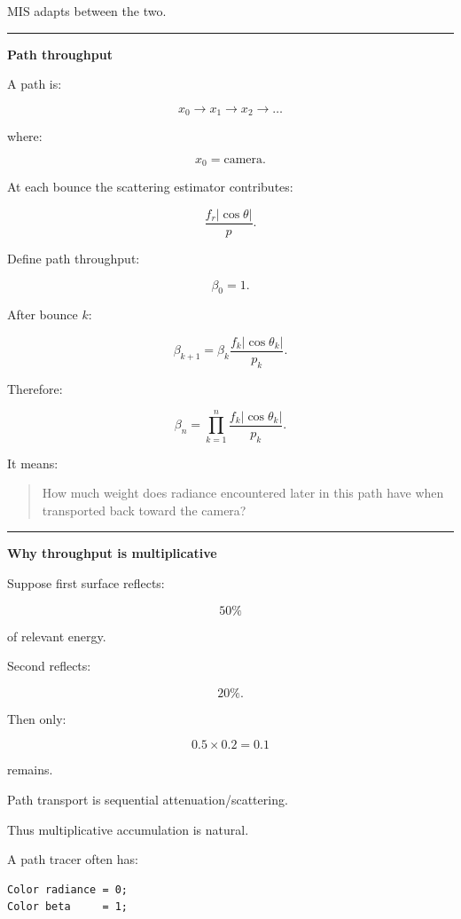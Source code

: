 MIS adapts between the two.

\begin{center}\rule{0.5\linewidth}{0.5pt}\end{center}

\textbf{Path throughput}

A path is:

\[
x_0\rightarrow x_1\rightarrow x_2\rightarrow\dots
\]

where:

\[
x_0=\text{camera}.
\]

At each bounce the scattering estimator contributes:

\[
\frac{
f_r
|\cos\theta|
}{
p
}.
\]

Define path throughput:

\[
\boxed{
\beta_0=1.
}
\]

After bounce \(k\):

\[
\boxed{
\beta_{k+1}
=
\beta_k
\frac{
f_k|\cos\theta_k|
}{
p_k
}.
}
\]

Therefore:

\[
\boxed{
\beta_n
=
\prod_{k=1}^{n}
\frac{
f_k|\cos\theta_k|
}{
p_k
}.
}
\]

It means:

\begin{quote}
How much weight does radiance encountered later in this path have when transported back toward the camera?
\end{quote}

\begin{center}\rule{0.5\linewidth}{0.5pt}\end{center}

\textbf{Why throughput is multiplicative}

Suppose first surface reflects:

\[
50\%
\]

of relevant energy.

Second reflects:

\[
20\%.
\]

Then only:

\[
0.5\times0.2=0.1
\]

remains.

Path transport is sequential attenuation/scattering.

Thus multiplicative accumulation is natural.

A path tracer often has:

\begin{verbatim}
Color radiance = 0;
Color beta     = 1;
\end{verbatim}


